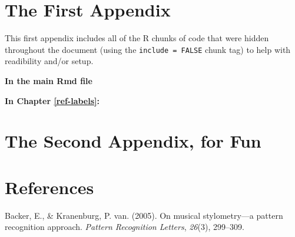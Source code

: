 \documentclass[12pt,twoside]{reedthesis}
\theoremstyle{definition}
\theoremstyle{definition}
\theoremstyle{definition}
\theoremstyle{remark}
\begin{document}
\appendix

\chapter{The First Appendix}\label{the-first-appendix}

This first appendix includes all of the R chunks of code that were
hidden throughout the document (using the \texttt{include\ =\ FALSE}
chunk tag) to help with readibility and/or setup.

\textbf{In the main Rmd file}
\begin{Shaded}
\begin{Highlighting}[]
\NormalTok{(}\OperatorTok{!}
  \NormalTok{(}\NormalTok{, } \NormalTok{)}
\NormalTok{(}\OperatorTok{!}
\OperatorTok{::}\NormalTok{(}\NormalTok{)}
\end{Highlighting}
\end{Shaded}
\textbf{In Chapter \ref{ref-labels}:}

\chapter{The Second Appendix, for
Fun}\label{the-second-appendix-for-fun}

\backmatter

\chapter*{References}\label{references}


\noindent

\setlength{\parindent}{-0.20in} \setlength{\leftskip}{0.20in}
\setlength{\parskip}{8pt}

\hypertarget{refs}{}
\hypertarget{ref-backer2005}{}
Backer, E., \& Kranenburg, P. van. (2005). On musical stylometry---a
pattern recognition approach. \emph{Pattern Recognition Letters},
\emph{26}(3), 299--309.
\end{document}
